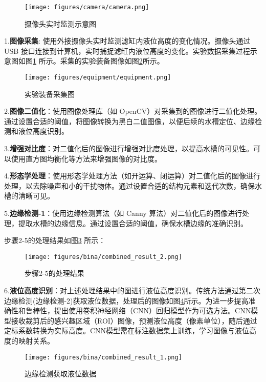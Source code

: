 \begin{figure}[H]
    \centering
    \texttt{[image: figures/camera/camera.png]}
    \caption{摄像头实时监测示意图}
    \label{fig:camera}
\end{figure}

1.\textbf{图像采集}: 使用外接摄像头实时监测滤缸内液位高度的变化情况。摄像头通过 USB 接口连接到计算机，实时捕捉滤缸内液位高度的变化。实验数据采集过程示意图如图\ref{fig:camera} 所示。采集的实验装备图像如图\ref{fig:equipment}所示。

\begin{figure}[H]
    \centering
    \texttt{[image: figures/equipment/equipment.png]}
    \caption{实验装备采集图}
    \label{fig:equipment}
\end{figure}

2.\textbf{图像二值化}：使用图像处理库（如 OpenCV）对采集到的图像进行二值化处理。通过设置合适的阈值，将图像转换为黑白二值图像，以便后续的水槽定位、边缘检测和液位高度识别\textsuperscript{\cite{ref13}}。

3.\textbf{增强对比度}：对二值化后的图像进行增强对比度处理\textsuperscript{\cite{ref14}}，以提高水槽的可见性。可以使用直方图均衡化等方法来增强图像的对比度。

4.\textbf{形态学处理}：使用形态学处理方法（如开运算、闭运算）对二值化后的图像进行处理，以去除噪声和小的干扰物体。通过设置合适的结构元素和迭代次数，确保水槽的清晰可见。

5.\textbf{边缘检测-1}：使用边缘检测算法（如 Canny 算法）对二值化后的图像进行处理，提取水槽的边缘信息。通过设置合适的阈值，确保水槽边缘的准确识别。

步骤2-5的处理结果如图\ref{fig:combined_result_2.png} 所示：

\begin{figure}[H]
    \centering
    \texttt{[image: figures/bina/combined\_result\_2.png]}
    \caption{步骤2-5的处理结果}
    \label{fig:combined_result_2.png}
\end{figure}

6.\textbf{液位高度识别}：对上述处理结果中的图进行液位高度识别。传统方法通过第二次边缘检测(边缘检测-2)获取液位数据，处理后的图像如图\ref{fig:combined_result_1.png}所示。为进一步提高准确性和鲁棒性，提出使用卷积神经网络（CNN）回归模型作为可选方法。CNN模型接收裁剪后的感兴趣区域（ROI）图像，预测液位高度（像素单位），随后通过定标系数转换为实际高度。CNN模型需在标注数据集上训练，学习图像与液位高度的映射关系。

\begin{figure}[H]
    \centering
    \texttt{[image: figures/bina/combined\_result\_1.png]}
    \caption{边缘检测获取液位数据}
    \label{fig:combined_result_1.png}
\end{figure}

